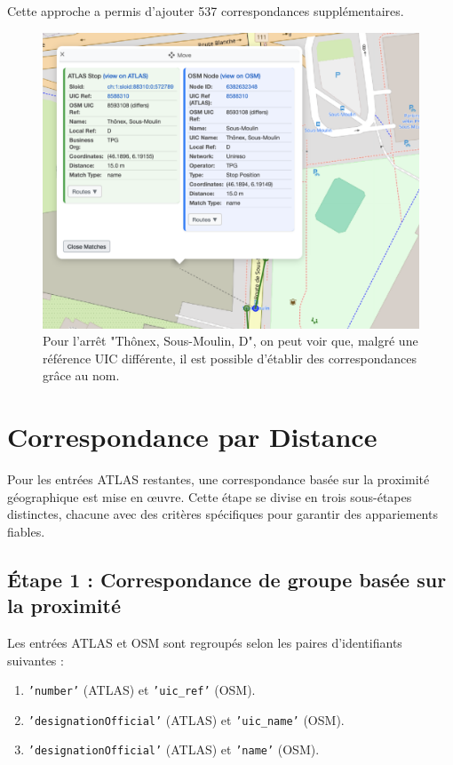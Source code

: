 Cette approche a permis d'ajouter 537 correspondances supplémentaires.
\begin{figure}[h]
    \centering
    \includegraphics[width=\textwidth]{../figures/correspondances/matched_name.png}
    \caption[Exemple de correspondance par nom]{Pour l'arrêt "Thônex, Sous-Moulin, D", on peut voir que, malgré une référence UIC différente, il est possible d'établir des correspondances grâce au nom.}
    \label{fig:name_matching_example}
\end{figure}


\section{Correspondance par Distance}

Pour les entrées ATLAS restantes, une correspondance basée sur la proximité géographique est mise en œuvre. Cette étape se divise en trois sous-étapes distinctes, chacune avec des critères spécifiques pour garantir des appariements fiables.

\subsection{Étape 1 : Correspondance de groupe basée sur la proximité}
Les entrées ATLAS et OSM sont regroupés selon les paires d’identifiants suivantes :
\begin{enumerate}
    \item \texttt{'number'} (ATLAS) et \texttt{'uic\_ref'} (OSM).
    \item \texttt{'designationOfficial'} (ATLAS) et \texttt{'uic\_name'} (OSM).
    \item \texttt{'designationOfficial'} (ATLAS) et \texttt{'name'} (OSM).
\end{enumerate}

